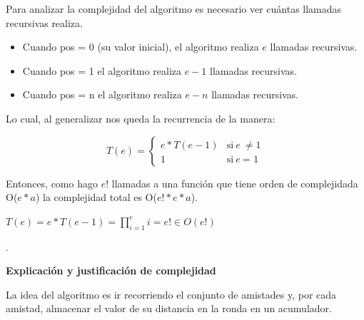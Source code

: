 \documentclass[spanish,a4paper]{article}
\begin{document}
Para analizar la complejidad del algoritmo es necesario ver cuántas llamadas recursivas realiza.
\begin{itemize}
\item Cuando pos = 0 (su valor inicial), el algoritmo realiza $e$ llamadas recursivas.
\item Cuando pos = 1 el algoritmo realiza $e-1$ llamadas recursivas.
\item Cuando pos = n el algoritmo realiza $e-n$ llamadas recursivas.
\end{itemize}

Lo cual, al generalizar nos queda la recurrencia de la manera:

\vspace{1mm}

\[ T(e) = 
  \begin{cases} 
    e * T(e-1) & \mbox{si} \ e \ \neq \mbox{1} \\
    1 & \mbox{si} \ e \ \mbox{= 1} 
  \end{cases}
\]

\vspace{2mm}

Entonces, como hago $e!$  llamadas a una función que tiene orden de complejidada O($e*a$) la complejidad 
total es O($e!*e*a$).

\begin{center}
$T(e) = e * T(e-1) = \prod_{i=1}^{e} i = e! \in O(e!)$
\end{center}

\vspace{5mm}
\noindent\makebox[\linewidth]{\rule{17cm}{0.4pt}}

.
\\

\vspace{3mm}
\begin{center}
\textbf{Explicación y justificación de complejidad} \\ 
\end{center} 
La idea del algoritmo es ir recorriendo el conjunto de amistades y, por cada amistad, almacenar el valor de 
su distancia en la ronda en un acumulador.
\end{document}
